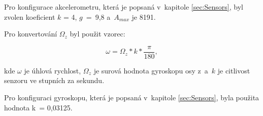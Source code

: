 Pro konfigurace akcelerometru, která je popsaná v~kapitole \ref{sec:Sensors}, 
byl zvolen koeficient $k$ = 4, $g$~=~9,8 a~$A_{max}$ je 8191.

Pro konvertování $\Omega_z$ byl použit vzorec:

\begin{equation}
\omega = \Omega_z * k * \frac{\pi}{180},
\end{equation}

kde $\omega$ je úhlová rychlost, $\Omega_z$ je surová hodnota gyroskopu osy
z~a~$k$ je citlivost senzoru ve stupních za sekundu. 

Pro konfiguraci gyroskopu, která je popsaná v~kapitole \ref{sec:Sensors}, 
byla použita hodnota k~= 0,03125.

\endinput